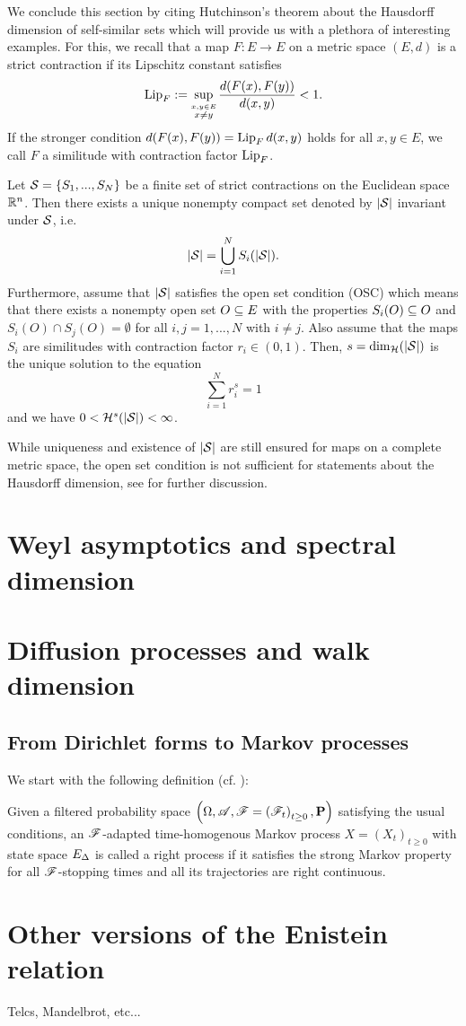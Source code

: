 We conclude this section by citing Hutchinson's theorem about the Hausdorff dimension of self-similar sets which will provide us with a plethora of interesting examples. For this, we recall that a map $F:E\to E$ on a metric space $(E,d)$ is a strict contraction if its Lipschitz constant satisfies
\[
  \operatorname{Lip}_F:=\sup_{\stackrel{x,y\in E}{x\neq y}}\frac{d(F(x),F(y))}{d(x,y)}<1.
\]
If the stronger condition $d(F(x),F(y))=\operatorname{Lip}_F d(x,y)$ holds for all $x,y\in E$, we call $F$ a similitude with contraction factor $\operatorname{Lip}_F$.
\begin{thm}
  Let $\mathcal{S}=\{S_1,...,S_N\}$ be a finite set of strict contractions on the Euclidean space $\mathbb{R}^n$. Then there exists a unique nonempty compact set denoted by $|\mathcal{S}|$ invariant under $\mathcal{S}$, i.e.
  \[
    |\mathcal{S}|=\bigcup_{i=1}^N S_i(|\mathcal{S}|).
  \]
  Furthermore, assume that $|\mathcal{S}|$ satisfies the open set condition (OSC) which means that there exists a nonempty open set $O\subseteq E$ with the properties $S_i(O)\subseteq O$ and $S_i(O)\cap S_j(O)=\emptyset$ for all $i,j=1,...,N$ with $i\neq j$. Also assume that the maps $S_i$ are similitudes with contraction factor $r_i\in(0,1)$. Then, $s=\dim_{\mathcal{H}}(|\mathcal{S}|)$ is the unique solution to the equation
  \[
    \sum_{i=1}^N r_i^s=1
  \]
  and we have $0<\mathcal{H}^s(|\mathcal{S}|)<\infty$. 
\end{thm}
While uniqueness and existence of $|\mathcal{S}|$ are still ensured for maps on a complete metric space, the open set condition is not sufficient for statements about the Hausdorff dimension, see \cite{schief1996self} for further discussion. 



\section{Weyl asymptotics and spectral dimension}

\section{Diffusion processes and walk dimension}

\subsection{From Dirichlet forms to Markov processes}

We start with the following definition (cf. \cite[Def. IV.1.13]{ma2012introduction}):
\begin{defin}
  Given a filtered probability space $\left(\Omega,\mathscr{A},\mathscr{F}=\left(\mathscr{F}_t\right)_{t\geq0},\mathbf{P}\right)$ satisfying the usual conditions, an $\mathscr{F}$-adapted time-homogenous Markov process $X=(X_t)_{t\geq0}$ with state space $E_\Delta$ is called a right process if it satisfies the strong Markov property for all $\mathscr{F}$-stopping times and all its trajectories are right continuous.  
\end{defin}

\section{Other versions of the Enistein relation}

Telcs, Mandelbrot, etc...

